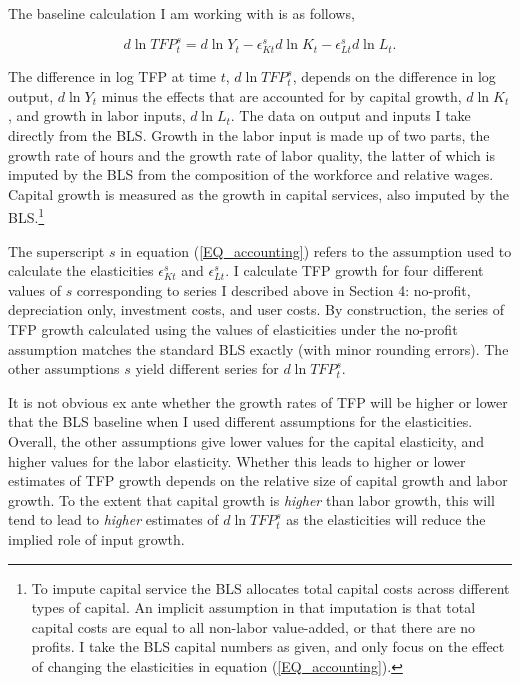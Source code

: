 \documentclass[11pt]{article}
\begin{document}
The baseline calculation I am working with is as follows,

\begin{equation}
	d \ln TFP^s_t = d \ln Y_t - \epsilon^s_{Kt} d \ln K_t - \epsilon^s_{Lt} d \ln L_t. \label{EQ_accounting}
\end{equation}

The difference in log TFP at time $t$, $d \ln TFP^s_t$, depends on the difference in log output, $d \ln Y_t$ minus the effects that are accounted for by capital growth, $d \ln K_t$, and growth in labor inputs, $d \ln L_t$. The data on output and inputs I take directly from the BLS. Growth in the labor input is made up of two parts, the growth rate of hours and the growth rate of labor quality, the latter of which is imputed by the BLS from the composition of the workforce and relative wages. Capital growth is measured as the growth in capital services, also imputed by the BLS.\footnote{To impute capital service the BLS allocates total capital costs across different types of capital. An implicit assumption in that imputation is that total capital costs are equal to all non-labor value-added, or that there are no profits. I take the BLS capital numbers as given, and only focus on the effect of changing the elasticities in equation (\ref{EQ_accounting}).}

The superscript $s$ in equation (\ref{EQ_accounting}) refers to the assumption used to calculate the elasticities $\epsilon^s_{Kt}$ and $\epsilon^s_{Lt}$. I calculate TFP growth for four different values of $s$ corresponding to series I described above in Section 4: no-profit, depreciation only, investment costs, and user costs. By construction, the series of TFP growth calculated using the values of elasticities under the no-profit assumption matches the standard BLS exactly (with minor rounding errors). The other assumptions $s$ yield different series for $d \ln TFP^s_t$.

It is not obvious ex ante whether the growth rates of TFP will be higher or lower that the BLS baseline when I used different assumptions for the elasticities. Overall, the other assumptions give lower values for the capital elasticity, and higher values for the labor elasticity. Whether this leads to higher or lower estimates of TFP growth depends on the relative size of capital growth and labor growth. To the extent that capital growth is \textit{higher} than labor growth, this will tend to lead to \textit{higher} estimates of $d \ln TFP^s_t$ as the elasticities will reduce the implied role of input growth. 
\end{document}

